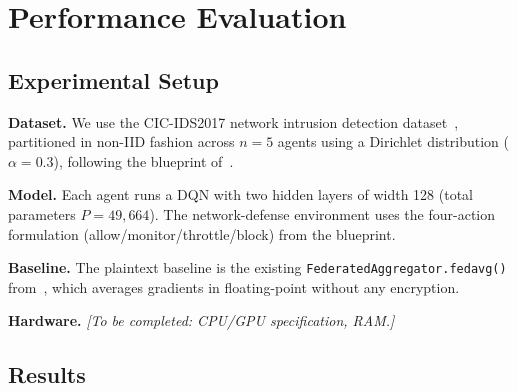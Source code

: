 \documentclass[letterpaper,journal]{IEEEtran}
\begin{document}
\section{Performance Evaluation}\label{sec:evaluation}

\subsection{Experimental Setup}

\textbf{Dataset.}
We use the CIC-IDS2017 network intrusion detection dataset~\cite{cicids2017},
partitioned in non-IID fashion across $n=5$ agents using a Dirichlet
distribution ($\alpha = 0.3$), following the blueprint
of~\cite{frlconf2026}.

\textbf{Model.}
Each agent runs a DQN with two hidden layers of width 128
(total parameters $P = 49{,}664$).
The network-defense environment uses the four-action formulation
(allow/monitor/throttle/block) from the blueprint.

\textbf{Baseline.}
The plaintext baseline is the existing \texttt{FederatedAggregator.fedavg()}
from~\cite{frlconf2026}, which averages gradients in floating-point without
any encryption.

\textbf{Hardware.}
\textit{[To be completed: CPU/GPU specification, RAM.]}

\subsection{Results}
\end{document}
